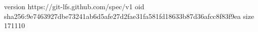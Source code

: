 version https://git-lfs.github.com/spec/v1
oid sha256:9e7463927dbe73241ab6d5afe27d2fae31fa581fd18633b87d36afcc8f83f9ea
size 171110
